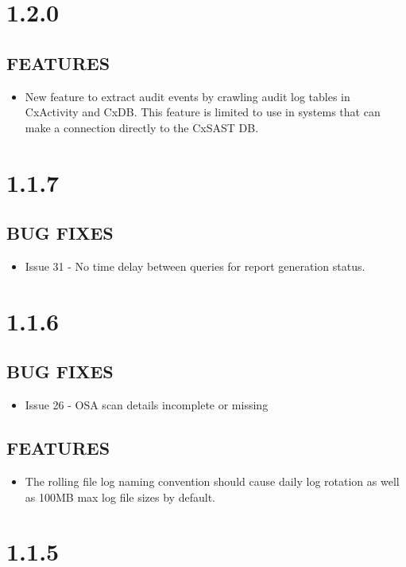 \section{1.2.0}
\subsection*{FEATURES}
    \begin{itemize}
        \item New feature to extract audit events by crawling audit log tables in CxActivity and CxDB.  This feature is limited to use in systems that can make a connection directly to the CxSAST DB.
    \end{itemize}

\section{1.1.7}
\subsection*{BUG FIXES}
    \begin{itemize}
        \item Issue 31 - No time delay between queries for report generation status.
    \end{itemize}


\section{1.1.6}
\subsection*{BUG FIXES}
    \begin{itemize}
        \item Issue 26 - OSA scan details incomplete or missing
    \end{itemize}
\subsection*{FEATURES}
    \begin{itemize}
        \item The rolling file log naming convention should cause daily log rotation as well as 100MB max log file sizes by default.
    \end{itemize}

\section{1.1.5}

